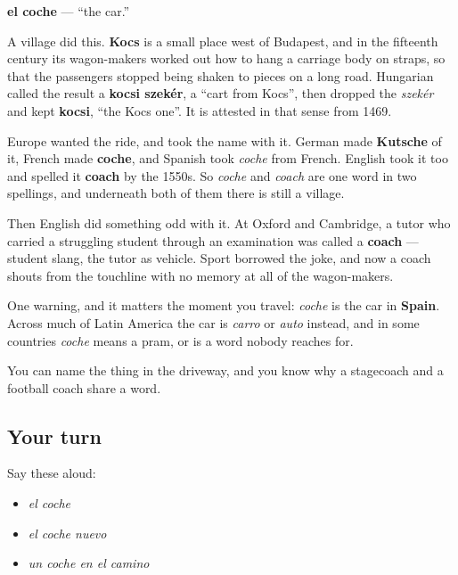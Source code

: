 \begin{cousinweb}
\textbf{el coche} — \textquotedblleft{}the car.\textquotedblright{}

A village did this. \textbf{Kocs} is a small place west of Budapest, and in the fifteenth century its wagon-makers worked out how to hang a carriage body on straps, so that the passengers stopped being shaken to pieces on a long road. Hungarian called the result a \textbf{kocsi szekér}, a \textquotedblleft{}cart from Kocs\textquotedblright{}, then dropped the \emph{szekér} and kept \textbf{kocsi}, \textquotedblleft{}the Kocs one\textquotedblright{}. It is attested in that sense from 1469.

Europe wanted the ride, and took the name with it. German made \textbf{Kutsche} of it, French made \textbf{coche}, and Spanish took \emph{coche} from French. English took it too and spelled it \textbf{coach} by the 1550s. So \emph{coche} and \emph{coach} are one word in two spellings, and underneath both of them there is still a village.

Then English did something odd with it. At Oxford and Cambridge, a tutor who carried a struggling student through an examination was called a \textbf{coach} — student slang, the tutor as vehicle. Sport borrowed the joke, and now a coach shouts from the touchline with no memory at all of the wagon-makers.

One warning, and it matters the moment you travel: \emph{coche} is the car in \textbf{Spain}. Across much of Latin America the car is \emph{carro} or \emph{auto} instead, and in some countries \emph{coche} means a pram, or is a word nobody reaches for.
\end{cousinweb}

\begin{grammarlens}[title={What you've built}]
You can name the thing in the driveway, and you know why a stagecoach and a football coach share a word.
\end{grammarlens}

\subsection*{Your turn}
Say these aloud:

\begin{itemize}
\raggedright
  \item \emph{el coche}
  \item \emph{el coche nuevo}
  \item \emph{un coche en el camino}
\end{itemize}

